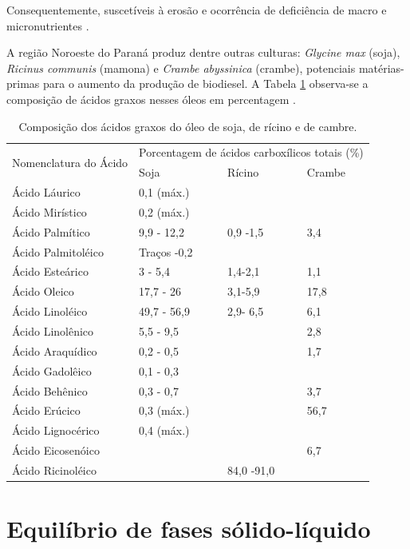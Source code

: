Consequentemente,  suscetíveis à erosão e ocorrência de deficiência de macro e micronutrientes \cite{Fonseca2005}.
    
A região  Noroeste do Paraná produz dentre outras culturas: \textit{Glycine max} (soja), \textit{Ricinus communis} (mamona) e \textit{Crambe abyssinica} (crambe), potenciais matérias-primas para o aumento da produção de biodiesel. A Tabela \ref{tab:angelica} observa-se a composição de ácidos graxos nesses óleos em percentagem \cite{Angelica}.

\begin{table}[H]
\centering
\caption{Composição dos ácidos graxos do óleo de soja, de rícino e de cambre.}
\begin{tabular}{lp{2.5cm}p{2.5cm}p{2.5cm}}
\hline
\multirow{2}{*}{Nomenclatura do Ácido} & \multicolumn{3}{l}{Porcentagem de ácidos carboxílicos totais (\%)}  \\
    & Soja  & Rícino & Crambe  \\
    \hline
     Ácido Láurico      & 0,1 (máx.)  &  & \\
     Ácido Mirístico    & 0,2 (máx.)  &  &  \\
     Ácido Palmítico    & 9,9 - 12,2  & 0,9 -1,5 & 3,4  \\
     Ácido Palmitoléico & Traços -0,2 &  &  \\
     Ácido Esteárico    & 3 - 5,4     & 1,4-2,1  & 1,1 \\
     Ácido Oleico       & 17,7 - 26   & 3,1-5,9 & 17,8 \\
     Ácido Linoléico    & 49,7 - 56,9 & 2,9- 6,5 & 6,1 \\
     Ácido Linolênico   & 5,5 - 9,5   &  & 2,8 \\
     Ácido Araquídico   & 0,2 - 0,5   &  & 1,7 \\
     Ácido Gadolêico    & 0,1 - 0,3   &  &  \\
     Ácido Behênico     & 0,3 - 0,7   &  & 3,7 \\
     Ácido Erúcico      & 0,3 (máx.)  &  & 56,7 \\
     Ácido Lignocérico  & 0,4 (máx.)  &  &  \\
     Ácido Eicosenóico  &             &  & 6,7 \\
     Ácido Ricinoléico  &             & 84,0 -91,0 &  \\
     \hline
\end{tabular}
\label{tab:angelica}
\end{table}

\section{Equilíbrio de fases sólido-líquido}
	
